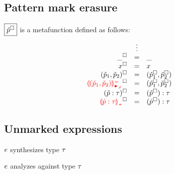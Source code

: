\documentclass[formalism.tex]{subfiles}
\begin{document}
\subsection{Pattern mark erasure}
\label{sec:patterned-pattern-mark-erasure}
$\judgbox{\erase{\PCMV}}$ is a metafunction defined as follows:
%
\newcommand{\erasesToRow}[2]{\erase{#1} & = & #2}
\[\begin{array}{rcl}
  & \vdots & \\
  \erasesToRow{\PCWild}{\PWild} \\
  \erasesToRow{\PCVar{x}}{\PVar{x}} \\
  \erasesToRow{\PCPair{\PCMV_1}{\PCMV_2}}{\PPair{\erase{\PCMV_1}}{\erase{\PCMV_2}}} \\
  \erasesToRow{\PCPairAnaNonMatchedProd{\PCMV_1}{\PCMV_2}}{\PPair{\erase{\PCMV_1}}{\erase{\PCMV_2}}} \\
  \erasesToRow{(\PCAsc{\PCMV}{\TMV})}{\PAsc{(\erase{\PCMV})}{\TMV}} \\
  \erasesToRow{\PCInconType{\PCAsc{\PCMV}{\TMV}}}{\PAsc{(\erase{\PCMV})}{\TMV}}
\end{array}\]

\subsection{Unmarked expressions}
\label{sec:patterned-unmarked-expressions}
\judgbox{\ctxSynTypeU{\ctx}{\EMV}{\TMV}} $\EMV$ synthesizes type $\TMV$
%
\begin{mathpar}
\end{mathpar}

\judgbox{\ctxAnaTypeU{\ctx}{\EMV}{\TMV}} $\EMV$ analyzes against type $\TMV$
%
\begin{mathpar}

\end{mathpar}
\end{document}
